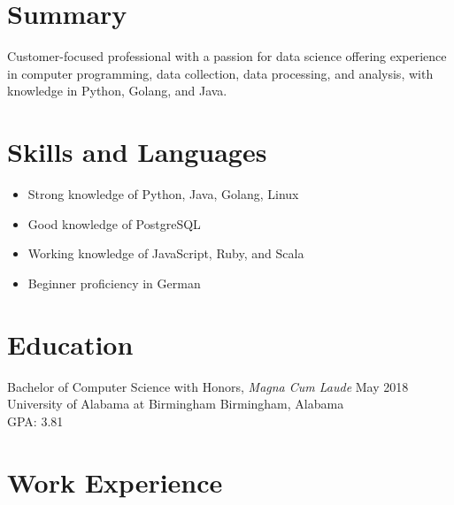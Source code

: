 \documentclass[10pt]{setzerresume}
\begin{document}


  \section{Summary}
  Customer-focused professional with a passion for data science offering experience in computer programming, data collection, data processing, and analysis, with knowledge in Python, Golang, and Java.

  \section{Skills and Languages}

  \begin{itemize}[nosep]
    \item Strong knowledge of Python, Java, Golang, Linux
    \item Good knowledge of PostgreSQL
    \item Working knowledge of JavaScript, Ruby, and Scala
    \item Beginner proficiency in German
  \end{itemize}

  \section{Education}
  Bachelor of Computer Science with Honors, \textit{Magna Cum Laude} \hfill May 2018 \\
  University of Alabama at Birmingham \hfill Birmingham, Alabama \\
  GPA\@: 3.81


  \section{Work Experience}

\end{document}
